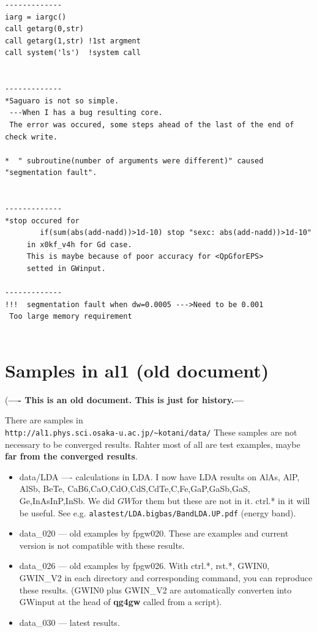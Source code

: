 \documentclass[a4paper,10pt,epsf,fleqn]{article}
\newcommand{\GW}{$GW$}
\newcommand{\exe}[1]{{\bf #1}}
\newcommand{\io}[1]{{\sf  #1}}
\begin{document}
\begin{verbatim}
-------------
iarg = iargc()
call getarg(0,str)
call getarg(1,str) !1st argment
call system('ls')  !system call


-------------
*Saguaro is not so simple.
 ---When I has a bug resulting core.
 The error was occured, some steps ahead of the last of the end of check write.

*  " subroutine(number of arguments were different)" caused "segmentation fault".


-------------
*stop occured for 
        if(sum(abs(add-nadd))>1d-10) stop "sexc: abs(add-nadd))>1d-10"
     in x0kf_v4h for Gd case.
     This is maybe because of poor accuracy for <QpGforEPS>
     setted in GWinput.

-------------
!!!  segmentation fault when dw=0.0005 --->Need to be 0.001
 Too large memory requirement


\end{verbatim}




\section{Samples in al1 (old document)} 

({\bf ---- This is an old document. This is just for history.---}

There are samples in\\
\verb#http://al1.phys.sci.osaka-u.ac.jp/~kotani/data/#
These samples are not necessary to be converged results.
Rahter most of all are test examples, maybe 
{\bf far from the converged results}.
\begin{itemize}
\item 
data/LDA ---- calculations in LDA. 
I now have LDA results on AlAs, AlP, AlSb,
BeTe, CaB6,CaO,CdO,CdS,CdTe,C,Fe,GaP,GaSb,GaS,
Ge,InAsInP,InSb. We did \GW for them but these are not in it. 
ctrl.* in it will be useful. 
See e.g. \verb#alastest/LDA.bigbas/BandLDA.UP.pdf# (energy band).

\item 
data\_020 --- old examples by fpgw020. These are examples and current version 
is not compatible with these results.

\item 
data\_026 --- old examples by fpgw026.
With \io{ctrl.*, rst.*, GWIN0, GWIN\_V2} in each directory and corresponding command,
you can reproduce these results. (\io{GWIN0} plus \io{GWIN\_V2}
are automatically converten into \io{GWinput} at the head of \exe{qg4gw} called from a script).

\item 
data\_030 --- latest results.

\end{itemize}
\end{document}
